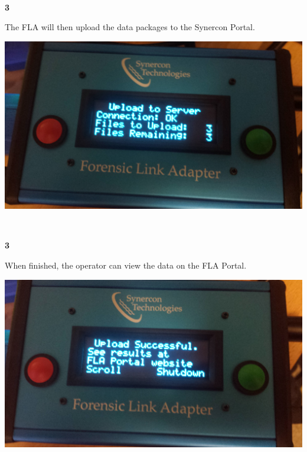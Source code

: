 \documentclass[11pt, oneside]{book}
\begin{document}
\\[\baselineskip]
\noindent\begin{minipage}{0.45\textwidth}%
\begin{center}
\textbf{3}\\[\baselineskip]
\end{center}
The FLA will then upload the data packages to the Synercon Portal.
\end{minipage}%
\hfill%
\begin{minipage}{0.45\textwidth}
\includegraphics[width=\linewidth]{../media/fla_screens/upload_uploading}
\end{minipage}
\\[\baselineskip]
\noindent\begin{minipage}{0.45\textwidth}%
\begin{center}
\textbf{3}\\[\baselineskip]
\end{center}
When finished, the operator can view the data on the FLA Portal.
\end{minipage}%
\hfill%
\begin{minipage}{0.45\textwidth}
\includegraphics[width=\linewidth]{../media/fla_screens/upload_finished}
\end{minipage}
\end{document}
